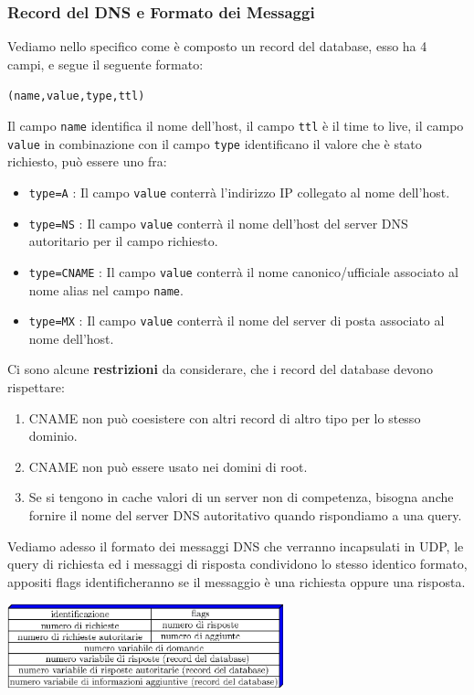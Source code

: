 \documentclass[12pt, letterpaper]{article}
\newcommand{\code}[1]{\colorbox{light-gray}{\texttt{#1}}}
\begin{document}
\subsubsection{Record del DNS e Formato dei Messaggi}
Vediamo nello specifico come è composto un record del database, esso ha 4 campi, e segue il seguente 
formato:\begin{center}
    \code{(name,value,type,ttl)}
\end{center}
Il campo \code{name} identifica il nome dell'host, il campo \code{ttl} è il time to live, il campo 
\code{value} in combinazione con il campo \code{type} identificano il valore che è stato richiesto, può 
essere uno fra:\begin{itemize}
    \item \code{type=A} : Il campo \code{value} conterrà l'indirizzo IP collegato al nome dell'host.
    \item \code{type=NS} : Il campo \code{value} conterrà il nome dell'host del server DNS autoritario 
    per il campo richiesto.
    \item \code{type=CNAME} :  Il campo \code{value} conterrà il nome canonico/ufficiale associato al nome 
    alias nel campo \code{name}.
    \item \code{type=MX}  :  Il campo \code{value} conterrà il nome del server di posta associato al 
    nome dell'host.
\end{itemize}
Ci sono alcune \textbf{restrizioni} da considerare, che i record del database devono rispettare:\begin{enumerate}
    \item CNAME non può coesistere con altri record di altro tipo per lo stesso
    dominio.
    \item CNAME non può essere usato nei domini di root. 
    \item Se si tengono in cache valori di un server non di competenza,
    bisogna anche fornire il nome del server DNS autoritativo quando rispondiamo a una
    query.
\end{enumerate}
Vediamo adesso il formato dei messaggi DNS che verranno incapsulati in UDP, le query di richiesta ed i 
messaggi di risposta condividono lo stesso identico formato, appositi flags identificheranno se il messaggio 
è una richiesta oppure una risposta.\begin{center}
    \includegraphics[width=0.6\textwidth ]{images/messaggioDNS.eps}
\end{center}
\end{document}

